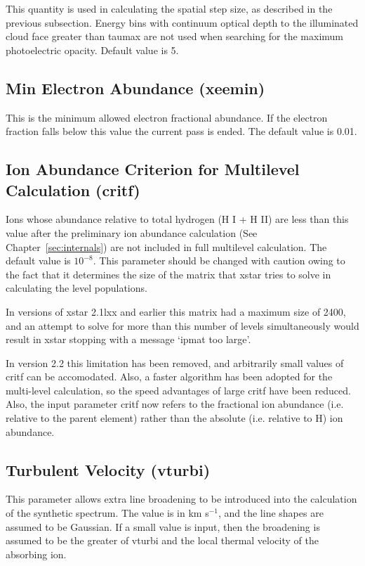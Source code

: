 This quantity is used in calculating the spatial step size, as described in the 
previous subsection.  Energy bins with continuum optical depth to the 
illuminated cloud face greater than taumax are not used when searching for the 
maximum photoelectric opacity.  Default value is 5.

\subsection{Min Electron Abundance (xeemin)}

This is the minimum allowed electron fractional abundance.  If the electron fraction 
falls below this value the current pass is ended.  The default value is 0.01.

\subsection{Ion Abundance Criterion for Multilevel Calculation (critf)}

Ions whose abundance relative to total hydrogen (H I + H II) are less than this 
value after the preliminary ion abundance calculation 
(See Chapter~\ref{sec:internals}) are not included in
full multilevel calculation.  The default value is $10^{-8}$.  This parameter should be changed 
with caution owing to the fact that it determines the size of the matrix that 
xstar tries to solve in calculating the level populations.  

In versions of xstar 2.1lxx and earlier this matrix had 
a maximum size of 2400, and an attempt to solve for more than this number of levels 
simultaneously would result in xstar stopping with a message `ipmat too large'.

In version 2.2 this limitation has been removed, and arbitrarily small values of critf 
can be accomodated.  Also, a faster algorithm has been adopted for the multi-level calculation,
so the speed advantages of large critf have been reduced.
Also, the input parameter critf now 
refers to the fractional ion abundance (i.e. relative to the parent element) 
rather than the absolute (i.e. relative to H) ion abundance.
\subsection{Turbulent Velocity (vturbi)}

This parameter allows extra line broadening to be introduced into the 
calculation of the synthetic spectrum.  The value is in km s$^{-1}$, 
and the line shapes are assumed to be Gaussian.  If a small value is input,
then the broadening is assumed to be the greater of vturbi and the 
local thermal velocity of the absorbing ion.

